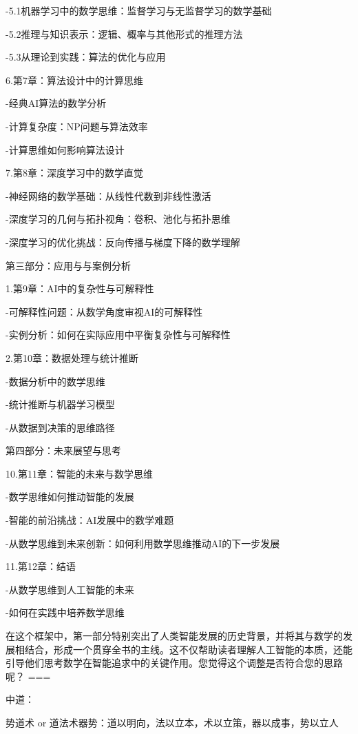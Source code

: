 -5.1机器学习中的数学思维：监督学习与无监督学习的数学基础

-5.2推理与知识表示：逻辑、概率与其他形式的推理方法

-5.3从理论到实践：算法的优化与应用

6.第7章：算法设计中的计算思维

-经典AI算法的数学分析

-计算复杂度：NP问题与算法效率

-计算思维如何影响算法设计

7.第8章：深度学习中的数学直觉

-神经网络的数学基础：从线性代数到非线性激活

-深度学习的几何与拓扑视角：卷积、池化与拓扑思维

-深度学习的优化挑战：反向传播与梯度下降的数学理解

    第三部分：应用与与案例分析

1.第9章：AI中的复杂性与可解释性

-可解释性问题：从数学角度审视AI的可解释性

-实例分析：如何在实际应用中平衡复杂性与可解释性

2.第10章：数据处理与统计推断

-数据分析中的数学思维

-统计推断与机器学习模型

-从数据到决策的思维路径

    第四部分：未来展望与思考
    
10.第11章：智能的未来与数学思维

-数学思维如何推动智能的发展

-智能的前沿挑战：AI发展中的数学难题

-从数学思维到未来创新：如何利用数学思维推动AI的下一步发展

11.第12章：结语

-从数学思维到人工智能的未来

-如何在实践中培养数学思维




在这个框架中，第一部分特别突出了人类智能发展的历史背景，并将其与数学的发展相结合，形成一个贯穿全书的主线。这不仅帮助读者理解人工智能的本质，还能引导他们思考数学在智能追求中的关键作用。您觉得这个调整是否符合您的思路呢？
===

中道：



势道术 or 道法术器势：道以明向，法以立本，术以立策，器以成事，势以立人






